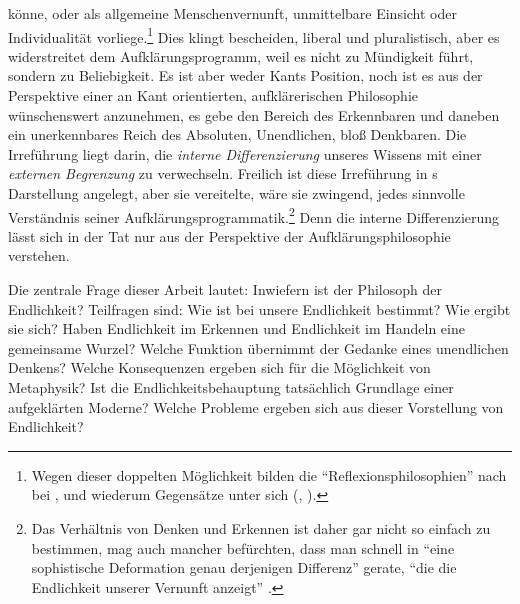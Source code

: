 könne, oder als allgemeine Menschenvernunft, unmittelbare Einsicht oder Individualität
 vorliege.\footnote{Wegen dieser doppelten Möglichkeit bilden
die \enquote{Reflexionsphilosophien} nach  bei
,
und  wiederum Gegensätze unter
sich
\mkbibparens{\cite[vgl.][]{Hegel:GlaubenundWissenoderdieReflexionsphilosophiederSubjektivitaetinderVollstaendigkeitihrerFormenalsKantischeJacobischeundFichteschePhilosophie1968},
\cite[][IV: 321.1--18]{Hegel:GesammelteWerke}}.} Dies klingt bescheiden, liberal
und pluralistisch, aber es widerstreitet dem Aufklärungsprogramm, weil es nicht
zu Mündigkeit führt, sondern zu Beliebigkeit. Es ist aber weder Kants Position,
noch ist es aus der Perspektive einer an Kant orientierten, aufklärerischen
Philosophie wünschenswert anzunehmen, es gebe den Bereich des Erkennbaren und
daneben ein unerkennbares Reich des Absoluten, Unendlichen, bloß Denkbaren. Die
Irreführung liegt darin, die \emph{interne Differenzierung} unseres Wissens mit
einer \emph{externen Begrenzung} zu verwechseln. Freilich ist diese Irreführung
in s Darstellung angelegt, aber sie vereitelte, wäre sie zwingend,
jedes sinnvolle Verständnis seiner Aufklärungsprogrammatik.\footnote{Das
Verhältnis von Denken und Erkennen ist daher gar nicht so einfach zu bestimmen,
mag auch mancher befürchten, dass man schnell in \enquote{eine sophistische
Deformation genau derjenigen Differenz} gerate, \enquote{die die Endlichkeit unserer
Vernunft anzeigt} \parencite[][843]{Schnaedelbach:WirKantianer2005}.} Denn die
interne Differenzierung lässt sich in der Tat nur aus der Perspektive der
Aufklärungsphilosophie verstehen.



Die zentrale Frage dieser Arbeit lautet: Inwiefern ist  der Philosoph
der Endlichkeit? Teilfragen sind: Wie ist bei  unsere Endlichkeit
bestimmt? Wie ergibt sie sich? Haben Endlichkeit im Erkennen und Endlichkeit im
Handeln eine gemeinsame Wurzel? Welche Funktion übernimmt der Gedanke eines
unendlichen Denkens? Welche Konsequenzen ergeben sich für die Möglichkeit von
Metaphysik? Ist die Endlichkeitsbehauptung tatsächlich Grundlage einer
aufgeklärten Moderne? Welche Probleme ergeben sich aus dieser Vorstellung von
Endlichkeit?

